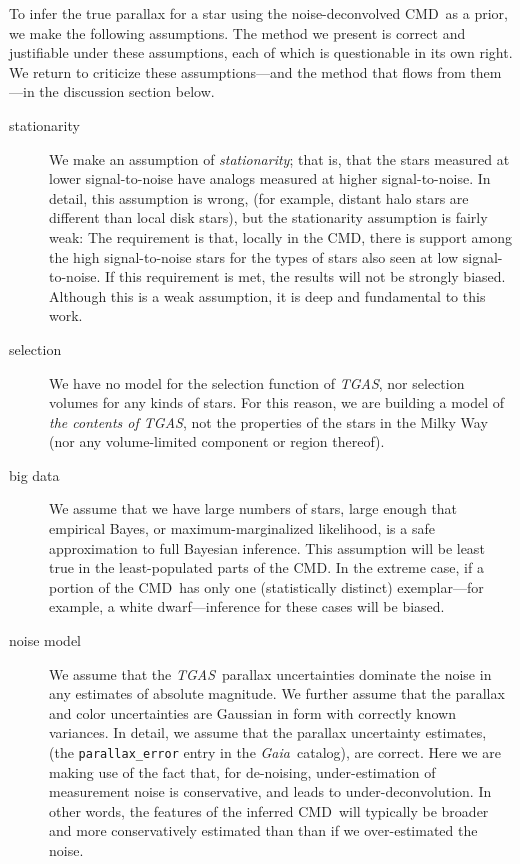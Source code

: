\documentclass[modern]{aastex61}
\newcommand{\acronym}[1]{{\small{#1}}}
\newcommand{\project}[1]{\textsl{#1}}
\newcommand{\tgas}{\project{\acronym{TGAS}}}
\newcommand{\gaia}{\project{Gaia}}
\newcommand{\cmd}{\acronym{CMD}}
\begin{document}
To infer the true parallax for a star using the noise-deconvolved \cmd\ as
a prior, we make the following assumptions. The method we present is correct
and justifiable under these assumptions, each of which is questionable
in its own right. We return to criticize these assumptions---and the
method that flows from them---in the discussion section below.
\begin{description}
\item[stationarity] We make an assumption of \emph{stationarity}; that is, that the
  stars measured at lower signal-to-noise have analogs measured at
  higher signal-to-noise.
  In detail, this assumption is wrong, (for example, distant halo stars are different than local
  disk stars), but the stationarity assumption is fairly weak:
  The requirement is that, locally in the \cmd, there is
  support among the high signal-to-noise stars for the types
  of stars also seen at low signal-to-noise.
  If this requirement is met, the results will not be
  strongly biased. Although this is a weak assumption, it is deep and fundamental to this
  work.
\item[selection] We have no model for the selection function of \tgas,
  nor selection volumes for any kinds of stars.
  For this reason, we are building a model of \emph{the contents of \tgas}, not the
  properties of the stars in the Milky Way (nor any volume-limited component or region
  thereof).
\item[big data] We assume that we have large numbers of stars, large enough that
  empirical Bayes, or maximum-marginalized likelihood, is a safe
  approximation to full Bayesian inference. This assumption will be
  least true in the least-populated parts of the \cmd. In the extreme
  case, if a portion of the \cmd\ has only one (statistically distinct)
  exemplar---for example, a white dwarf---inference for these cases will be biased.
\item[noise model] We assume that the \tgas\ parallax uncertainties dominate the
  noise in any estimates of absolute magnitude. We further assume that
  the parallax and color uncertainties are Gaussian in form with
  correctly known variances. In detail, we assume that the parallax uncertainty estimates,
  (the \texttt{parallax{\_}error} entry in the \gaia\ catalog), are correct.
  Here we are making use of the fact that, for
  de-noising, under-estimation of measurement noise is conservative, and leads to under-deconvolution. In other words, the features of the inferred \cmd\ will typically be broader and more conservatively estimated than than if we over-estimated the noise. 

\end{description}
\end{document}
